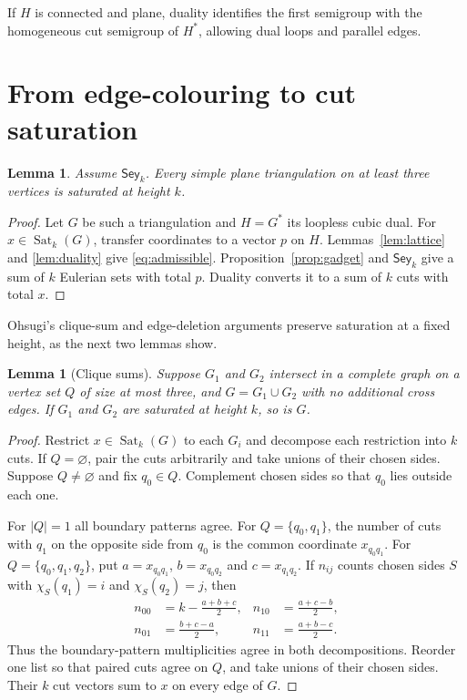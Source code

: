 \documentclass[10pt]{article}
\newtheorem{lemma}[theorem]{Lemma}
\theoremstyle{definition}
\theoremstyle{remark}
\DeclareMathOperator{\Sat}{Sat}
\begin{document}
If $H$ is connected and plane, duality identifies the first semigroup with the homogeneous cut semigroup of $H^*$, allowing dual loops and parallel edges.

\section{From edge-colouring to cut saturation}\label{sec:forward}
\begin{lemma}\label{lem:triangulation}
Assume $\mathsf{Sey}_k$.
Every simple plane triangulation on at least three vertices is saturated at height $k$.
\end{lemma}
\begin{proof}
Let $G$ be such a triangulation and $H=G^*$ its loopless cubic dual.
For $x\in\Sat_k(G)$, transfer coordinates to a vector $p$ on $H$.
Lemmas~\ref{lem:lattice} and \ref{lem:duality} give \eqref{eq:admissible}.
Proposition~\ref{prop:gadget} and $\mathsf{Sey}_k$ give a sum of $k$ Eulerian sets with total $p$.
Duality converts it to a sum of $k$ cuts with total $x$.
\end{proof}

Ohsugi's clique-sum and edge-deletion arguments \cite[Theorems~3.2 and~2.3]{Ohsugi} preserve saturation at a fixed height, as the next two lemmas show.

\begin{lemma}[Clique sums]\label{lem:clique}
Suppose $G_1$ and $G_2$ intersect in a complete graph on a vertex set $Q$ of size at most three, and $G=G_1\cup G_2$ with no additional cross edges.
If $G_1$ and $G_2$ are saturated at height $k$, so is $G$.
\end{lemma}
\begin{proof}
Restrict $x\in\Sat_k(G)$ to each $G_i$ and decompose each restriction into $k$ cuts.
If $Q=\varnothing$, pair the cuts arbitrarily and take unions of their chosen sides.
Suppose $Q\ne\varnothing$ and fix $q_0\in Q$.
Complement chosen sides so that $q_0$ lies outside each one.

For $|Q|=1$ all boundary patterns agree.
For $Q=\{q_0,q_1\}$, the number of cuts with $q_1$ on the opposite side from $q_0$ is the common coordinate $x_{q_0q_1}$.
For $Q=\{q_0,q_1,q_2\}$, put $a=x_{q_0q_1}$, $b=x_{q_0q_2}$ and $c=x_{q_1q_2}$.
If $n_{ij}$ counts chosen sides $S$ with $\chi_S(q_1)=i$ and $\chi_S(q_2)=j$, then
\begin{equation}\label{eq:boundary}
 \begin{aligned}
 n_{00}&=k-\frac{a+b+c}{2},& n_{10}&=\frac{a+c-b}{2},\\
 n_{01}&=\frac{b+c-a}{2},& n_{11}&=\frac{a+b-c}{2}.
 \end{aligned}
\end{equation}
Thus the boundary-pattern multiplicities agree in both decompositions.
Reorder one list so that paired cuts agree on $Q$, and take unions of their chosen sides.
Their $k$ cut vectors sum to $x$ on every edge of $G$.
\end{proof}
\end{document}
